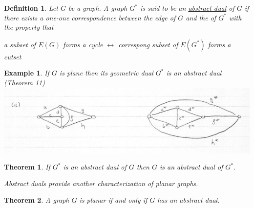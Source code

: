 \documentclass[12pt]{article}
\newtheorem{theorem}{Theorem}
\newtheorem{example}{Example}
\newtheorem{definition}{Definition}
\begin{document}
\begin{definition}
  Let $G$ be a graph. A graph $G^{*}$ is said to be an \underline{abstract dual} of $G$ if there exists a one-one correspondence between the edge of $G$ and the of $G^{*}$ with the property that

  a subset of $E(G)$ forms a cycle $\leftrightarrow$ correspong subset of $E(G^{*})$ forms a cutset
\end{definition}

\begin{example}
  If $G$ is plane then its geometric dual $G^{*}$ is an abstract dual (Theorem 11)
  \includegraphics[scale=0.5]{dual2}
\end{example}


\begin{theorem}
  If $G^{*}$ is an abstract dual of $G$ then $G$ is an abstract dual of $G^{*}$.

  Abstract duals provide another characterization of planar graphs.
\end{theorem}

\begin{theorem}
A graph $G$ is planar if and only if $G$ has an abstract dual.
\end{theorem}
\end{document}
